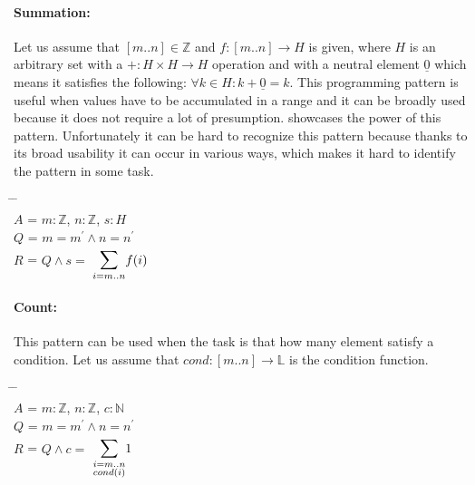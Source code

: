 \documentclass[12pt]{article}
\newcommand{\makesym}[4]{ $\mathlarger{\mathlarger{#1}}_{#2}^{#3} #4 $}
\begin{document}
    \paragraph{Summation:} Let us assume that $[m..n] \in \mathbb{Z}$ and $f:[m..n] \to H$ is given, where $H$ is an arbitrary set with a $+: H \times H \to H$ operation and with a neutral element $\underline{0}$ which means it satisfies the following: $\forall k \in H : k + \underline{0} = k$. This programming pattern is useful when values have to be accumulated in a range and it can be broadly used because it does not require a lot of presumption. \cite{Sum} showcases the power of this pattern. Unfortunately it can be hard to recognize this pattern because thanks to its broad usability it can occur in various ways, which makes it hard to identify the pattern in some task.    
    \begin{tabbing}
    \hspace*{0.5cm} \= \hspace*{0.5cm}  \= \hspace*{1.5cm}  \= \\
    $A$ \> = \> $m:\mathbb{Z}$, $n:\mathbb{Z}$, $s:H$ \\ 
    $Q$ \> = \> $m=m^{'} \land n=n^{'}$ \\
    $R$ \> = \> $Q \land s = $ \makesym{\sum}{i=m..n}{}{f(i)} 
    \end{tabbing}
    
    \paragraph{Count:} This pattern can be used when the task is that how many element  satisfy a condition. Let us assume that $cond : [m..n] \to \mathbb{L}$ is the condition function. 
    \begin{tabbing}
    \hspace*{0.5cm} \= \hspace*{0.5cm}  \= \hspace*{1.5cm}  \= \\
    $A$ \> = \> $m:\mathbb{Z}$, $n:\mathbb{Z}$, $c:\mathbb{N}$ \\ 
    $Q$ \> = \> $m=m^{'} \land n=n^{'}$ \\
    $R$ \> = \> $Q \land c = $ \makesym{\sum}{\substack{i=m..n \\ cond(i)}}{}{1} 
    \end{tabbing}
    
\end{document}
